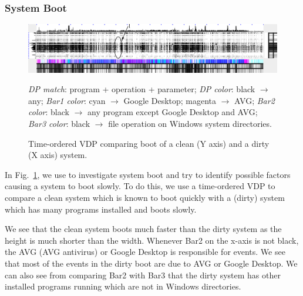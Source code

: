 \subsubsection{System Boot}
\label{sec:boot}

\begin{figure}[htb]
\includegraphics[width=1.0\textwidth]{lviz/boot-dp.png}
\caption{Time-ordered VDP comparing boot
of a clean (Y axis) and a dirty (X axis) system.
}
\label{fig:boot-dp}
{\it DP match}: program + operation + parameter;
{\it DP color}: black $\rightarrow$ any;
{\it Bar1 color}: cyan $\rightarrow$ Google Desktop; magenta $\rightarrow$ AVG;
{\it Bar2 color}: black $\rightarrow$ any program except Google Desktop and AVG;
{\it Bar3 color}: black $\rightarrow$ file operation on Windows system directories.
\end{figure}

In Fig.~\ref{fig:boot-dp}, we use  to investigate system boot and try to identify possible
factors causing a system to boot slowly.
To do this, we use a time-ordered VDP to
compare a clean system which is known to boot quickly
with a (dirty) system which has many programs installed and boots slowly.

We see that the clean system boots much faster than the dirty system 
as the height is much shorter than the width.
Whenever Bar2 on the x-axis is not black,
the AVG (AVG antivirus) or Google Desktop is responsible for events.
We see that most of the events in the dirty boot are due to AVG or Google
Desktop.
We can also see from comparing Bar2 with Bar3
that the dirty system has other installed programs running
which are not in Windows directories.

